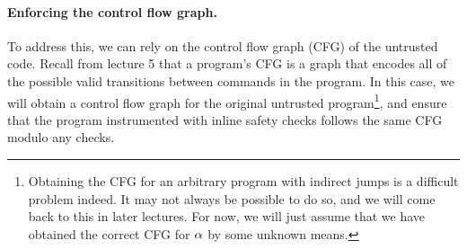\documentclass[11pt,twoside]{scrartcl}
\begin{document}
\paragraph{Enforcing the control flow graph.} To address this, we can rely on the control flow graph (CFG) of the untrusted code. Recall from lecture 5 that a program's CFG is a graph that encodes all of the possible valid transitions between commands in the program. In this case, we will obtain a control flow graph for the original untrusted program\footnote{Obtaining the CFG for an arbitrary program with indirect jumps is a difficult problem indeed. It may not always be possible to do so, and we will come back to this in later lectures. For now, we will just assume that we have obtained the correct CFG for $\alpha$ by some unknown means.}, and ensure that the program instrumented with inline safety checks follows the same CFG modulo any checks.
\end{document}
